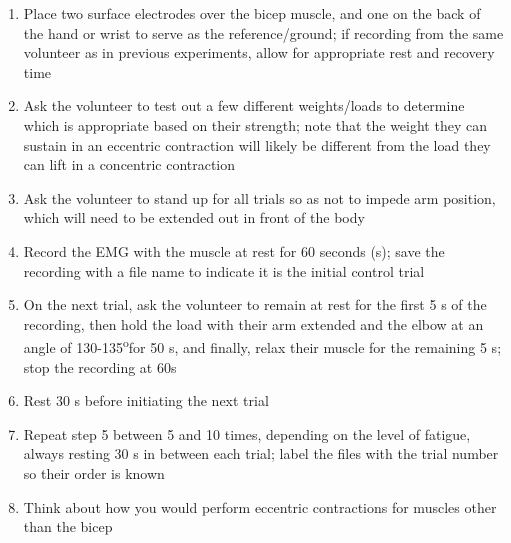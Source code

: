 \documentclass{article}
\begin{document}
\begin{enumerate}
\item Place two surface electrodes over the bicep muscle, and one on the back of the hand or wrist to serve as the reference/ground; if recording from the same volunteer as in previous experiments, allow for appropriate rest and recovery time
\item Ask the volunteer to test out a few different weights/loads to determine which is appropriate based on their strength; note that the weight they can sustain in an eccentric contraction will likely be different from the load they can lift in a concentric contraction
\item Ask the volunteer to stand up for all trials so as not to impede arm position, which will need to be extended out in front of the body
\item Record the EMG with the muscle at rest for 60 seconds (s); save the recording with a file name to indicate it is the initial control trial
\item On the next trial, ask the volunteer to remain at rest for the first 5 s of the recording, then hold the load with their arm extended and the elbow at an angle of 130-135\textsuperscript{o}for 50 s, and finally, relax their muscle for the remaining 5 s; stop the recording at 60s
\item Rest 30 s before initiating the next trial
\item Repeat step 5 between 5 and 10 times, depending on the level of fatigue, always resting 30 s in between each trial; label the files with the trial number so their order is known
\item Think about how you would perform eccentric contractions for muscles other than the bicep
\end{enumerate}

\clearpage

\end{document}
